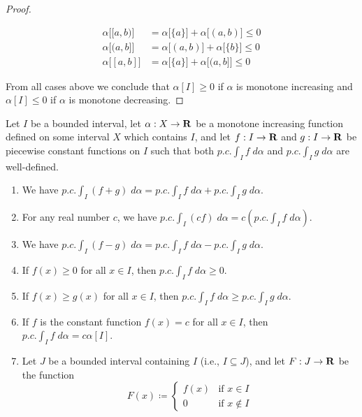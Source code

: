 \begin{proof}
\begin{itemize}
              \begin{align*}
                  \alpha\big[[a, b)\big] & = \alpha\big[\{a\}\big] + \alpha\big[(a, b)\big] \leq 0 \\
                  \alpha\big[(a, b]\big] & = \alpha\big[(a, b)\big] + \alpha\big[\{b\}\big] \leq 0 \\
                  \alpha\big[[a, b]\big] & = \alpha\big[\{a\}\big] + \alpha\big[(a, b]\big] \leq 0
              \end{align*}
    \end{itemize}
    From all cases above we conclude that \(\alpha[I] \geq 0\) if \(\alpha\) is monotone increasing and \(\alpha[I] \leq 0\) if \(\alpha\) is monotone decreasing.
\end{proof}

\begin{additional corollary}\label{ac 11.8.7}
Let \(I\) be a bounded interval, let \(\alpha : X \to \mathbf{R}\) be a monotone increasing function defined on some interval \(X\) which contains \(I\), and let \(f : I \to \mathbf{R}\) and \(g : I \to \mathbf{R}\) be piecewise constant functions on \(I\) such that both \(p.c. \int_I f \; d \alpha\) and \(p.c. \int_I g \; d \alpha\) are well-defined.
\begin{enumerate}
    \item We have \(p.c. \int_I (f + g) \; d \alpha = p.c. \int_I f \; d \alpha + p.c. \int_I g \; d \alpha\).
    \item For any real number \(c\), we have \(p.c. \int_I (cf) \; d \alpha = c (p.c. \int_I f \; d \alpha)\).
    \item We have \(p.c. \int_I (f - g) \; d \alpha = p.c. \int_I f \; d \alpha - p.c. \int_I g \; d \alpha\).
    \item If \(f(x) \geq 0\) for all \(x \in I\), then \(p.c. \int_I f \; d \alpha \geq 0\).
    \item If \(f(x) \geq g(x)\) for all \(x \in I\), then \(p.c. \int_I f \; d \alpha \geq p.c. \int_I g \; d \alpha\).
    \item If \(f\) is the constant function \(f(x) = c\) for all \(x \in I\), then \(p.c. \int_I f \; d \alpha = c \alpha[I]\).
    \item Let \(J\) be a bounded interval containing \(I\) (i.e., \(I \subseteq J\)), and let \(F : J \to \mathbf{R}\) be the function
          \[
              F(x) \coloneqq \begin{cases}
                  f(x) & \text{if } x \in I    \\
                  0    & \text{if } x \notin I

\end{cases}\]
\end{enumerate}
\end{additional corollary}
